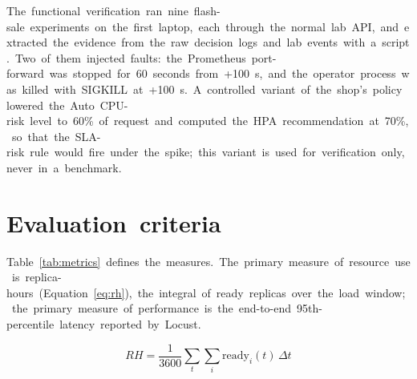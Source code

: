 \documentclass[12pt,a4paper,oneside]{report}
\begin{document}
The~functional~verification~ran~nine~flash-sale~experiments~on~the~first~laptop,~each~through~the~normal~lab~API,~and~extracted~the~evidence~from~the~raw~decision~logs~and~lab~events~with~a~script.~Two~of~them~injected~faults:~the~Prometheus~port-forward~was~stopped~for~60~seconds~from~+100~s,~and~the~operator~process~was~killed~with~SIGKILL~at~+100~s.~A~controlled~variant~of~the~shop's~policy~lowered~the~Auto~CPU-risk~level~to~60\%~of~request~and~computed~the~HPA~recommendation~at~70\%,~so~that~the~SLA-risk~rule~would~fire~under~the~spike;~this~variant~is~used~for~verification~only,~never~in~a~benchmark.


\section{Evaluation~criteria}

Table~\ref{tab:metrics}~defines~the~measures.~The~primary~measure~of~resource~use~is~replica-hours~(Equation~\ref{eq:rh}),~the~integral~of~ready~replicas~over~the~load~window;~the~primary~measure~of~performance~is~the~end-to-end~95th-percentile~latency~reported~by~Locust.


\begin{equation}\label{eq:rh}
RH = \frac{1}{3600}\sum_{t}\sum_{i} \mathrm{ready}_i(t)\,\Delta t
\end{equation}
\end{document}
